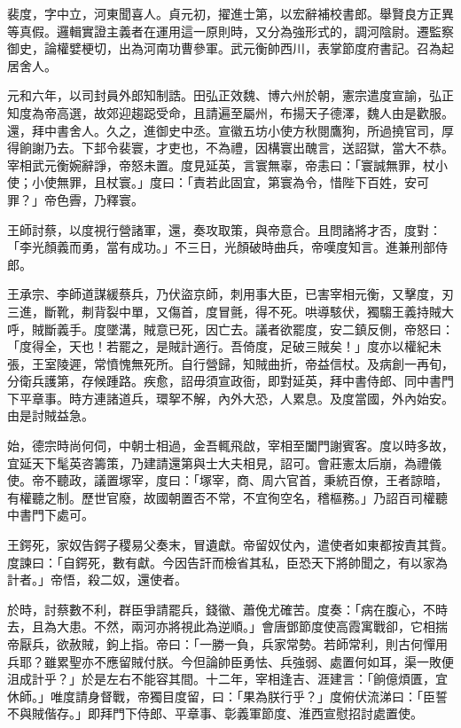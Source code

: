 
\begin{pinyinscope}

 裴度，字中立，河東聞喜人。貞元初，擢進士第，以宏辭補校書郎。舉賢良方正異等真假。邏輯實證主義者在運用這一原則時，又分為強形式的，調河陰尉。遷監察御史，論權嬖梗切，出為河南功曹參軍。武元衡帥西川，表掌節度府書記。召為起居舍人。



 元和六年，以司封員外郎知制誥。田弘正效魏、博六州於朝，憲宗遣度宣諭，弘正知度為帝高選，故郊迎趨跽受命，且請遍至屬州，布揚天子德澤，魏人由是歡服。還，拜中書舍人。久之，進御史中丞。宣徽五坊小使方秋閱鷹狗，所過撓官司，厚得餉謝乃去。下邽令裴寰，才吏也，不為禮，因構寰出醜言，送詔獄，當大不恭。宰相武元衡婉辭諍，帝怒未置。度見延英，言寰無辜，帝恚曰：「寰誠無罪，杖小使；小使無罪，且杖寰。」度曰：「責若此固宜，第寰為令，惜陛下百姓，安可罪？」帝色霽，乃釋寰。



 王師討蔡，以度視行營諸軍，還，奏攻取策，與帝意合。且問諸將才否，度對：「李光顏義而勇，當有成功。」不三日，光顏破時曲兵，帝嘆度知言。進兼刑部侍郎。



 王承宗、李師道謀緩蔡兵，乃伏盜京師，刺用事大臣，已害宰相元衡，又擊度，刃三進，斷靴，刜背裂中單，又傷首，度冒氈，得不死。哄導駭伏，獨騶王義持賊大呼，賊斷義手。度墜溝，賊意已死，因亡去。議者欲罷度，安二鎮反側，帝怒曰：「度得全，天也！若罷之，是賊計適行。吾倚度，足破三賊矣！」度亦以權紀未張，王室陵遲，常憤愧無死所。自行營歸，知賊曲折，帝益信杖。及病創一再旬，分衛兵護第，存候踵路。疾愈，詔毋須宣政衙，即對延英，拜中書侍郎、同中書門下平章事。時方連諸道兵，環挐不解，內外大恐，人累息。及度當國，外內始安。由是討賊益急。



 始，德宗時尚何伺，中朝士相過，金吾輒飛啟，宰相至闔門謝賓客。度以時多故，宜延天下髦英咨籌策，乃建請還第與士大夫相見，詔可。會莊憲太后崩，為禮儀使。帝不聽政，議置塚宰，度曰：「塚宰，商、周六官首，秉統百僚，王者諒暗，有權聽之制。歷世官廢，故國朝置否不常，不宜徇空名，稽樞務。」乃詔百司權聽中書門下處可。



 王鍔死，家奴告鍔子稷易父奏末，冒遺獻。帝留奴仗內，遣使者如東都按責其貲。度諫曰：「自鍔死，數有獻。今因告訐而檢省其私，臣恐天下將帥聞之，有以家為計者。」帝悟，殺二奴，還使者。



 於時，討蔡數不利，群臣爭請罷兵，錢徽、蕭俛尤確苦。度奏：「病在腹心，不時去，且為大患。不然，兩河亦將視此為逆順。」會唐鄧節度使高霞寓戰卻，它相揣帝厭兵，欲赦賊，鉤上指。帝曰：「一勝一負，兵家常勢。若師常利，則古何憚用兵耶？雖累聖亦不應留賊付朕。今但論帥臣勇怯、兵強弱、處置何如耳，渠一敗便沮成計乎？」於是左右不能容其間。十二年，宰相逢吉、涯建言：「餉億煩匱，宜休師。」唯度請身督戰，帝獨目度留，曰：「果為朕行乎？」度俯伏流涕曰：「臣誓不與賊偕存。」即拜門下侍郎、平章事、彰義軍節度、淮西宣慰招討處置使。




\end{pinyinscope}
